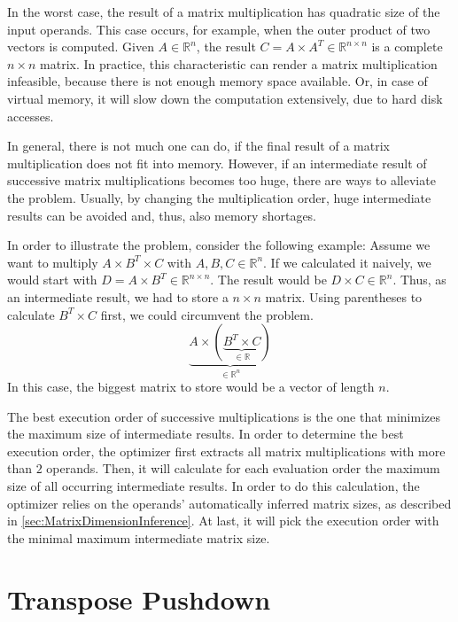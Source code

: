 In the worst case, the result of a matrix multiplication has quadratic size of the input operands.
This case occurs, for example, when the outer product of two vectors is computed.
Given $A \in \mathbb{R}^{n}$, the result $C = A\times A^T \in \mathbb{R}^{n\times n}$ is a complete $n\times n$ matrix.
In practice, this characteristic can render a matrix multiplication infeasible, because there is not enough memory space available.
Or, in case of virtual memory, it will slow down the computation extensively, due to hard disk accesses.

In general, there is not much one can do, if the final result of a matrix multiplication does not fit into memory.
However, if an intermediate result of successive matrix multiplications becomes too huge, there are ways to alleviate the problem.
Usually, by changing the multiplication order, huge intermediate results can be avoided and, thus, also memory shortages.

In order to illustrate the problem, consider the following example:
Assume we want to multiply $A\times B^T \times C$ with $A,B,C\in \mathbb{R}^{n}$.
If we calculated it naively, we would start with $D=A\times B^T \in \mathbb{R}^{n\times n}$.
The result would be $D\times C \in \mathbb{R}^{n}$.
Thus, as an intermediate result, we had to store a $n\times n$ matrix.
Using parentheses to calculate $B^T \times C$ first, we could circumvent the problem.
\begin{displaymath}
	\underbrace{A\times \left( \underbrace{B^T \times C}_{\in \mathbb{R}}\right)}_{\in \mathbb{R}^{n}}
\end{displaymath}
In this case, the biggest matrix to store would be a vector of length $n$.

The best execution order of successive multiplications is the one that minimizes the maximum size of intermediate results.
In order to determine the best execution order, the optimizer first extracts all matrix multiplications with more than $2$ operands.
Then, it will calculate for each evaluation order the maximum size of all occurring intermediate results.
In order to do this calculation, the optimizer relies on the operands' automatically inferred matrix sizes, as described in \cref{sec:MatrixDimensionInference}.
At last, it will pick the execution order with the minimal maximum intermediate matrix size.

\section{Transpose Pushdown}

